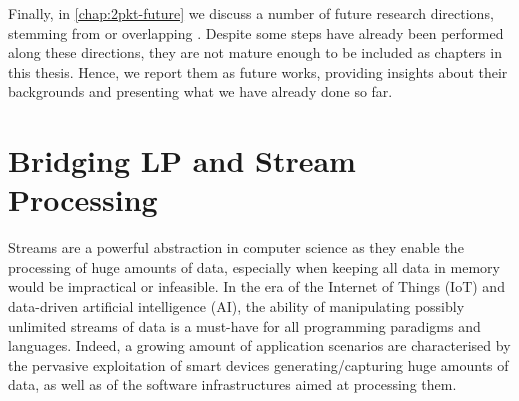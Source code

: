 \documentclass[12pt,a4paper,openright,twoside]{book}
\begin{document}
Finally, in \cref{chap:2pkt-future} we discuss a number of future research directions, stemming from or overlapping \twopkt{}.
%
Despite some steps have already been performed along these directions, they are not mature enough to be included as chapters in this thesis.
%
Hence, we report them as future works, providing insights about their backgrounds and presenting what we have already done so far.


%
%
%

\chapter{Bridging LP and Stream Processing}
\label{chap:lp-streams}


Streams are a powerful abstraction in computer science as they enable the processing of huge amounts of data, especially when keeping all data in memory would be impractical or infeasible.
%
In the era of the Internet of Things (IoT) and data-driven artificial intelligence (AI), the ability of manipulating possibly unlimited streams of data is a must-have for all programming paradigms and languages.
%
Indeed, a growing amount of application scenarios are characterised by the pervasive exploitation of smart devices generating/capturing huge amounts of data, as well as of the software infrastructures aimed at processing them.
\end{document}
